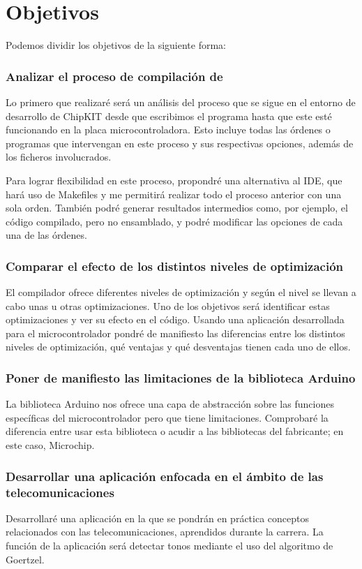 \section{Objetivos}
Podemos dividir los objetivos de la siguiente forma:

\subsubsection{Analizar el proceso de compilación de }
Lo primero que realizaré será un análisis del proceso que se sigue en el entorno de desarrollo de ChipKIT desde que escribimos el programa hasta que este esté funcionando en la placa microcontroladora.  Esto incluye todas las órdenes o programas que intervengan en este proceso y sus respectivas opciones, además de los ficheros involucrados.

Para lograr flexibilidad en este proceso, propondré una alternativa al IDE, que hará uso de Makefiles y me permitirá realizar todo el proceso anterior con una sola orden. También podré generar resultados intermedios como, por ejemplo, el código compilado, pero no ensamblado, y podré modificar las opciones de cada una de las órdenes.

\subsubsection{Comparar el efecto de los distintos niveles de optimización}
El compilador ofrece diferentes niveles de optimización y según el nivel se llevan a cabo unas u otras optimizaciones. Uno de los objetivos será identificar estas optimizaciones y ver su efecto en el código. Usando una aplicación desarrollada para el microcontrolador pondré de manifiesto las diferencias entre los distintos niveles de optimización, qué ventajas y qué desventajas tienen cada uno de ellos.

\subsubsection{Poner de manifiesto las limitaciones de la biblioteca Arduino}
La biblioteca Arduino nos ofrece una capa de abstracción sobre las funciones específicas del microcontrolador pero que tiene limitaciones. Comprobaré la diferencia entre usar esta biblioteca o acudir a las bibliotecas del fabricante; en este caso, Microchip.

\subsubsection{Desarrollar una aplicación enfocada en el ámbito de las telecomunicaciones}
Desarrollaré una aplicación en la que se pondrán en práctica conceptos relacionados con las telecomunicaciones, aprendidos durante la carrera. La función de la aplicación será detectar tonos mediante el uso del algoritmo de Goertzel.


